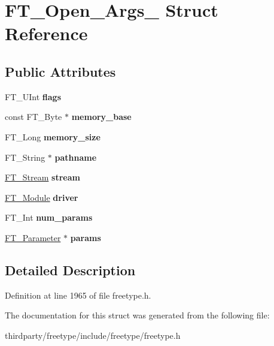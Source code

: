 \hypertarget{struct_f_t___open___args__}{}\section{F\+T\+\_\+\+Open\+\_\+\+Args\+\_\+ Struct Reference}
\label{struct_f_t___open___args__}
\subsection*{Public Attributes}
\begin{DoxyCompactItemize}
\item 
\mbox{\label{struct_f_t___open___args___a2e3e6b9284fe8b4d9833e247a19181fa}} 
F\+T\+\_\+\+U\+Int {\bfseries flags}
\item 
\mbox{\label{struct_f_t___open___args___a1231da51bc58922096b3bc603bb2ffb0}} 
const F\+T\+\_\+\+Byte $\ast$ {\bfseries memory\+\_\+base}
\item 
\mbox{\label{struct_f_t___open___args___a87f0bb2f257abe94c93a79e0de3525da}} 
F\+T\+\_\+\+Long {\bfseries memory\+\_\+size}
\item 
\mbox{\label{struct_f_t___open___args___aea3d454d9fd9bb7434aad07e651d027b}} 
F\+T\+\_\+\+String $\ast$ {\bfseries pathname}
\item 
\mbox{\label{struct_f_t___open___args___ae1e6444bf0c21b323ce6cbe8bc475b2b}} 
\hyperlink{struct_f_t___stream_rec__}{F\+T\+\_\+\+Stream} {\bfseries stream}
\item 
\mbox{\label{struct_f_t___open___args___a7c01bd7e34a440c3e89141ee521e2646}} 
\hyperlink{struct_f_t___module_rec__}{F\+T\+\_\+\+Module} {\bfseries driver}
\item 
\mbox{\label{struct_f_t___open___args___afaf47d9e1631f2147b696fd7f5a6f4eb}} 
F\+T\+\_\+\+Int {\bfseries num\+\_\+params}
\item 
\mbox{\label{struct_f_t___open___args___a77b279a34beba29bc14901926f79818f}} 
\hyperlink{struct_f_t___parameter__}{F\+T\+\_\+\+Parameter} $\ast$ {\bfseries params}
\end{DoxyCompactItemize}


\subsection{Detailed Description}


Definition at line 1965 of file freetype.\+h.



The documentation for this struct was generated from the following file\+:\begin{DoxyCompactItemize}
\item 
thirdparty/freetype/include/freetype/freetype.\+h\end{DoxyCompactItemize}

